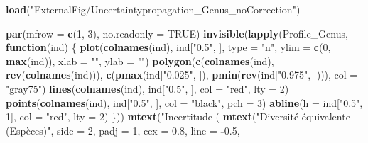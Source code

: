 \documentclass[
  11pt,
  french,
  A4paper,
  extrafontsizes,onecolumn,openright
  ]{memoir}
\newenvironment{Shaded}{\begin{snugshade}}{\end{snugshade}}
\newcommand{\KeywordTok}[1]{\textcolor[rgb]{0.13,0.29,0.53}{\textbf{#1}}}
\newcommand{\DataTypeTok}[1]{\textcolor[rgb]{0.13,0.29,0.53}{#1}}
\newcommand{\DecValTok}[1]{\textcolor[rgb]{0.00,0.00,0.81}{#1}}
\newcommand{\FloatTok}[1]{\textcolor[rgb]{0.00,0.00,0.81}{#1}}
\newcommand{\StringTok}[1]{\textcolor[rgb]{0.31,0.60,0.02}{#1}}
\newcommand{\OtherTok}[1]{\textcolor[rgb]{0.56,0.35,0.01}{#1}}
\newcommand{\ControlFlowTok}[1]{\textcolor[rgb]{0.13,0.29,0.53}{\textbf{#1}}}
\newcommand{\OperatorTok}[1]{\textcolor[rgb]{0.81,0.36,0.00}{\textbf{#1}}}
\newcommand{\NormalTok}[1]{#1}
\begin{document}
\begin{Shaded}
\begin{Highlighting}[]
\KeywordTok{load}\NormalTok{(}\StringTok{"ExternalFig/Uncertaintypropagation_Genus_noCorrection"}\NormalTok{)}

\KeywordTok{par}\NormalTok{(}\DataTypeTok{mfrow =} \KeywordTok{c}\NormalTok{(}\DecValTok{1}\NormalTok{, }\DecValTok{3}\NormalTok{), }\DataTypeTok{no.readonly =} \OtherTok{TRUE}\NormalTok{)}
\KeywordTok{invisible}\NormalTok{(}\KeywordTok{lapply}\NormalTok{(Profile_Genus, }\ControlFlowTok{function}\NormalTok{(ind) \{}
    \KeywordTok{plot}\NormalTok{(}\KeywordTok{colnames}\NormalTok{(ind), ind[}\StringTok{"0.5"}\NormalTok{, ], }\DataTypeTok{type =} \StringTok{"n"}\NormalTok{, }\DataTypeTok{ylim =} \KeywordTok{c}\NormalTok{(}\DecValTok{0}\NormalTok{, }\KeywordTok{max}\NormalTok{(ind)), }\DataTypeTok{xlab =} \StringTok{""}\NormalTok{, }
        \DataTypeTok{ylab =} \StringTok{""}\NormalTok{)}
    \KeywordTok{polygon}\NormalTok{(}\KeywordTok{c}\NormalTok{(}\KeywordTok{colnames}\NormalTok{(ind), }\KeywordTok{rev}\NormalTok{(}\KeywordTok{colnames}\NormalTok{(ind))), }\KeywordTok{c}\NormalTok{(}\KeywordTok{pmax}\NormalTok{(ind[}\StringTok{"0.025"}\NormalTok{, ]), }\KeywordTok{pmin}\NormalTok{(}\KeywordTok{rev}\NormalTok{(ind[}\StringTok{"0.975"}\NormalTok{, }
\NormalTok{        ]))), }\DataTypeTok{col =} \StringTok{"gray75"}\NormalTok{)}
    \KeywordTok{lines}\NormalTok{(}\KeywordTok{colnames}\NormalTok{(ind), ind[}\StringTok{"0.5"}\NormalTok{, ], }\DataTypeTok{col =} \StringTok{"red"}\NormalTok{, }\DataTypeTok{lty =} \DecValTok{2}\NormalTok{)}
    \KeywordTok{points}\NormalTok{(}\KeywordTok{colnames}\NormalTok{(ind), ind[}\StringTok{"0.5"}\NormalTok{, ], }\DataTypeTok{col =} \StringTok{"black"}\NormalTok{, }\DataTypeTok{pch =} \DecValTok{3}\NormalTok{)}
    \KeywordTok{abline}\NormalTok{(}\DataTypeTok{h =}\NormalTok{ ind[}\StringTok{"0.5"}\NormalTok{, }\DecValTok{1}\NormalTok{], }\DataTypeTok{col =} \StringTok{"red"}\NormalTok{, }\DataTypeTok{lty =} \DecValTok{2}\NormalTok{)}
\NormalTok{\}))}
\KeywordTok{mtext}\NormalTok{(}\StringTok{"Incertitude (%
\KeywordTok{mtext}\NormalTok{(}\StringTok{"Diversité équivalente (Espèces)"}\NormalTok{, }\DataTypeTok{side =} \DecValTok{2}\NormalTok{, }\DataTypeTok{padj =} \DecValTok{1}\NormalTok{, }\DataTypeTok{cex =} \FloatTok{0.8}\NormalTok{, }\DataTypeTok{line =} \OperatorTok{-}\FloatTok{0.5}\NormalTok{, }
}
\end{Highlighting}
\end{Shaded}
\end{document}
